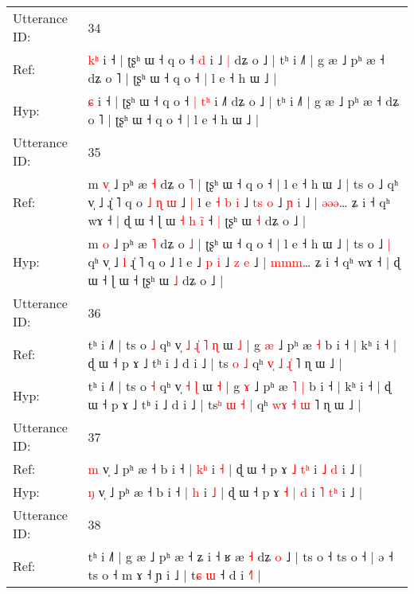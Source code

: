 \documentclass[10pt]{article}
\DeclareRobustCommand{\hl}[1]{{\textcolor{red}{#1}}}
\begin{document}
\begin{longtable}{ll}
Utterance ID: & 34 \\
Ref: & \hl{k}\hl{ʰ} i ˧ | ʈʂʰ ɯ ˧ q o ˧\hl{}\hl{} \hl{}\hl{d} i ˩\hl{ }\hl{|} dʑ o ˩ | tʰ i ˩˥ | g æ ˩ pʰ æ ˧ dʑ o ˥ | ʈʂʰ ɯ ˧ q o ˧ | l e ˧ h ɯ ˩ |
 \\
Hyp: & \hl{}\hl{ɕ} i ˧ | ʈʂʰ ɯ ˧ q o ˧\hl{ }\hl{|} \hl{t}\hl{ʰ} i ˩\hl{}\hl{˥} dʑ o ˩ | tʰ i ˩˥ | g æ ˩ pʰ æ ˧ dʑ o ˥ | ʈʂʰ ɯ ˧ q o ˧ | l e ˧ h ɯ ˩ |
 \\
\midrule
Utterance ID: & 35 \\
Ref: & m \hl{v}\hl{̩} ˩ pʰ æ \hl{˧} dʑ o \hl{˥} | ʈʂʰ ɯ ˧ q o ˧ | l e ˧ h ɯ ˩ | ts o ˩\hl{}\hl{} qʰ v̩ ˩\hl{}\hl{} ɻ̍ ˥ q o\hl{ }\hl{˩}\hl{ }\hl{ɳ}\hl{ }\hl{ɯ} ˩\hl{ }\hl{|} l e\hl{ }\hl{˧}\hl{ }\hl{b}\hl{ }\hl{i} ˩ \hl{t}\hl{s} \hl{o} ˩ \hl{ɲ} \hl{i} ˩ | \hl{ə}\hl{ə}\hl{ə}… ʑ i ˧ qʰ wɤ ˧ | ɖ ɯ ˧ ɭ ɯ\hl{ }\hl{˧}\hl{ }\hl{h}\hl{ }\hl{i}\hl{̃} ˧\hl{ }\hl{|} ʈʂʰ ɯ \hl{˧} dʑ o ˩ |
 \\
Hyp: & m \hl{}\hl{o} ˩ pʰ æ \hl{˥} dʑ o \hl{˩} | ʈʂʰ ɯ ˧ q o ˧ | l e ˧ h ɯ ˩ | ts o ˩\hl{ }\hl{|} qʰ v̩ ˩\hl{ }\hl{l} ɻ̍ ˥ q o\hl{}\hl{}\hl{}\hl{}\hl{}\hl{} ˩\hl{}\hl{} l e\hl{}\hl{}\hl{}\hl{}\hl{}\hl{} ˩ \hl{}\hl{p} \hl{i} ˩ \hl{z} \hl{e} ˩ | \hl{m}\hl{m}\hl{m}… ʑ i ˧ qʰ wɤ ˧ | ɖ ɯ ˧ ɭ ɯ\hl{}\hl{}\hl{}\hl{}\hl{}\hl{}\hl{} ˧\hl{}\hl{} ʈʂʰ ɯ \hl{˩} dʑ o ˩ |
 \\
\midrule
Utterance ID: & 36 \\
Ref: & tʰ i ˩˥ | ts o \hl{˩} qʰ v̩\hl{ }\hl{˩}\hl{ }\hl{ɻ}\hl{̍} \hl{˥} \hl{ɳ} ɯ \hl{˩} | g \hl{æ} ˩ pʰ æ\hl{}\hl{} \hl{˧} b i ˧ | kʰ i ˧ | ɖ ɯ ˧ p ɤ ˩ tʰ i ˩ d i ˩ | ts\hl{}\hl{}\hl{} \hl{o} \hl{˩} qʰ \hl{v}\hl{̩} \hl{˩} \hl{ɻ}\hl{̍} ˥ ɳ ɯ ˩ |
 \\
Hyp: & tʰ i ˩˥ | ts o \hl{˧} qʰ v̩\hl{}\hl{}\hl{}\hl{}\hl{} \hl{˧} \hl{ɭ} ɯ \hl{˧} | g \hl{ɤ} ˩ pʰ æ\hl{ }\hl{˥} \hl{|} b i ˧ | kʰ i ˧ | ɖ ɯ ˧ p ɤ ˩ tʰ i ˩ d i ˩ | ts\hl{ʰ}\hl{ }\hl{ɯ} \hl{˧} \hl{|} qʰ \hl{w}\hl{ɤ} \hl{˧} \hl{}\hl{ɯ} ˥ ɳ ɯ ˩ |
 \\
\midrule
Utterance ID: & 37 \\
Ref: & \hl{m} v̩ ˩ pʰ æ ˧ b i ˧ | \hl{k}\hl{ʰ} i \hl{˧} | ɖ ɯ ˧ p ɤ \hl{˩} \hl{}\hl{t}\hl{ʰ} i \hl{˩} \hl{}\hl{d} i ˩ |
 \\
Hyp: & \hl{ŋ} v̩ ˩ pʰ æ ˧ b i ˧ | \hl{}\hl{h} i \hl{˩} | ɖ ɯ ˧ p ɤ \hl{˧} \hl{|}\hl{ }\hl{d} i \hl{˥} \hl{t}\hl{ʰ} i ˩ |
 \\
\midrule
Utterance ID: & 38 \\
Ref: & tʰ i ˩˥ | g æ ˩ pʰ æ ˧ ʑ i ˧ ʁ æ\hl{}\hl{} \hl{˧} dʑ \hl{o} ˩ | ts o ˧ ts o ˧ | ə ˧ ts o ˧ m ɤ ˧ ɲ i ˩ | t\hl{ɕ} \hl{ɯ} ˧ d i \hl{˧}˥ |

\end{longtable}
\end{document}
